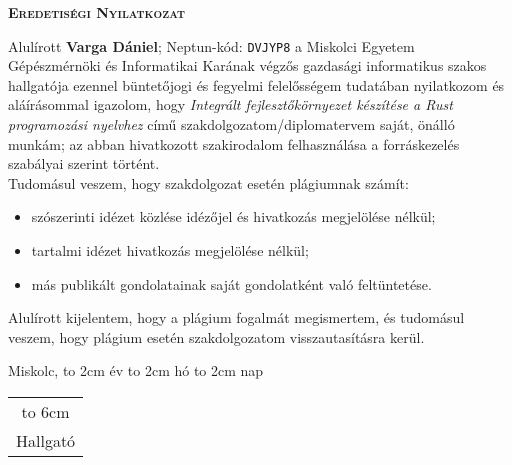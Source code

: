 \vspace*{1cm}  
\begin{center}
\large\textsc{\bfseries Eredetiségi Nyilatkozat}
\end{center}
\vspace*{2cm}

Alulírott \textbf{Varga Dániel}; Neptun-kód: \texttt{DVJYP8} a Miskolci Egyetem Gépészmérnöki és Informatikai Karának végzős gazdasági informatikus szakos hallgatója ezennel bün\-te\-tő\-jo\-gi és fegyelmi felelősségem tudatában nyilatkozom és aláírásommal igazolom, hogy
\textit{
Integrált fejlesztőkörnyezet készítése a Rust programozási nyelvhez
}
című szak\-dol\-go\-za\-tom/dip\-lo\-ma\-ter\-vem saját, önálló munkám; az abban hivatkozott szakirodalom
felhasználása a forráskezelés szabályai szerint történt.\\

Tudomásul veszem, hogy szakdolgozat esetén plágiumnak számít:
\begin{itemize}
\item szószerinti idézet közlése idézőjel és hivatkozás megjelölése nélkül;
\item tartalmi idézet hivatkozás megjelölése nélkül;
\item más publikált gondolatainak saját gondolatként való feltüntetése.
\end{itemize}

Alulírott kijelentem, hogy a plágium fogalmát megismertem, és tudomásul veszem, hogy
plágium esetén szakdolgozatom visszautasításra kerül.

\vspace*{3cm}

\noindent Miskolc, \hbox to 2cm{\dotfill} év \hbox to 2cm{\dotfill} hó \hbox to 2cm{\dotfill} nap

\vspace*{3cm}

\hspace*{8cm}\begin{tabular}{c}
\hbox to 6cm{\dotfill}\\
Hallgató
\end{tabular}
